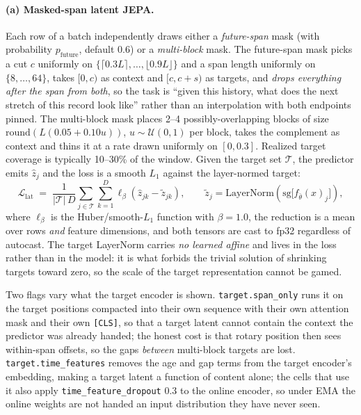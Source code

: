 \documentclass[11pt,a4paper]{article}
\newcommand{\code}[1]{\texttt{\small #1}}
\begin{document}
\paragraph{(a) Masked-span latent JEPA.}
Each row of a batch independently draws either a \emph{future-span} mask (with
probability $p_{\mathrm{future}}$, default 0.6) or a \emph{multi-block} mask.
The future-span mask picks a cut $c$ uniformly on
$\{\lceil 0.3L\rceil, \ldots, \lfloor 0.9L\rfloor\}$ and a span length
uniformly on $\{8, \ldots, 64\}$, takes $[0, c)$ as context and $[c, c+s)$ as
targets, and \emph{drops everything after the span from both}, so the task is
``given this history, what does the next stretch of this record look like''
rather than an interpolation with both endpoints pinned. The multi-block mask
places 2--4 possibly-overlapping blocks of size
$\mathrm{round}\!\left(L(0.05 + 0.10u)\right)$, $u \sim \mathcal{U}(0,1)$ per
block, takes the complement as context and thins it at a rate drawn uniformly
on $[0, 0.3]$. Realized target coverage is typically 10--30\% of the window.
Given the target set $\mathcal{T}$, the predictor emits $\hat z_j$ and the loss
is a smooth $L_1$ against the layer-normed target:
\begin{equation}
\mathcal{L}_{\mathrm{lat}}
\;=\;
\frac{1}{|\mathcal{T}|\,D}\sum_{j \in \mathcal{T}}\sum_{k=1}^{D}
\ell_\beta\!\left(\hat z_{jk} - \tilde z_{jk}\right),
\qquad
\tilde z_j = \mathrm{LayerNorm}\!\left(\mathrm{sg}\big[f_{\bar\theta}(x)_j\big]\right),
\end{equation}
where $\ell_\beta$ is the Huber/smooth-$L_1$ function with $\beta = 1.0$, the
reduction is a mean over rows \emph{and} feature dimensions, and both tensors
are cast to fp32 regardless of autocast. The target LayerNorm carries \emph{no
learned affine} and lives in the loss rather than in the model: it is what
forbids the trivial solution of shrinking targets toward zero, so the scale of
the target representation cannot be gamed.

Two flags vary what the target encoder is shown.
\code{target.span\_only} runs it on the target positions compacted into their
own sequence with their own attention mask and their own \code{[CLS]}, so that a
target latent cannot contain the context the predictor was already handed; the
honest cost is that rotary position then sees within-span offsets, so the gaps
\emph{between} multi-block targets are lost. \code{target.time\_features}
removes the age and gap terms from the target encoder's embedding, making a
target latent a function of content alone; the cells that use it also apply
\code{time\_feature\_dropout} 0.3 to the online encoder, so under EMA the online
weights are not handed an input distribution they have never seen.
\end{document}
